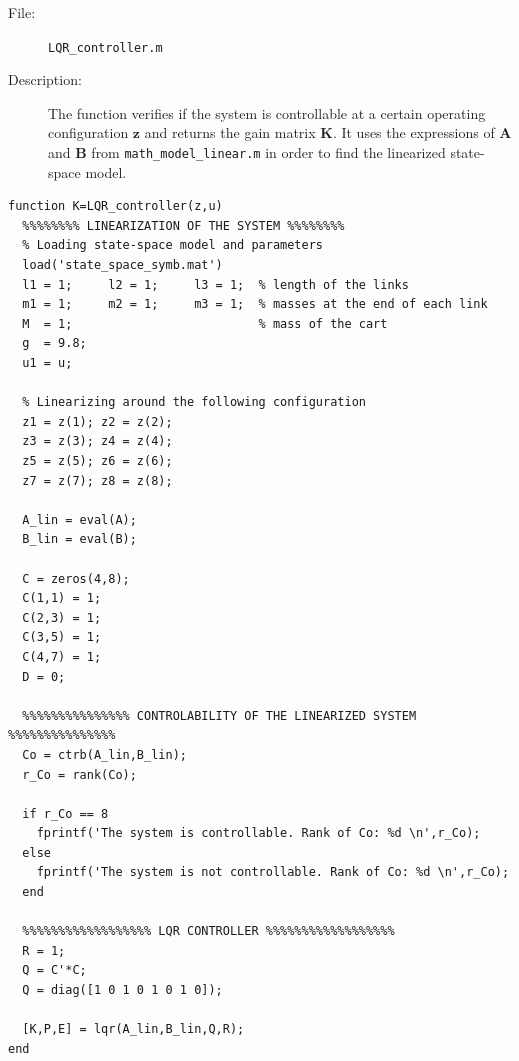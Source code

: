 \documentclass[a4paper,12pt]{article}
\begin{document}
\begin{description}
	\item[File:] \texttt{LQR\_controller.m}
	\item[Description:] The function verifies if the system is controllable at a certain operating configuration $\mathbf{z}$ and returns the gain matrix $\mathbf{K}$. It uses the expressions of $\mathbf{A}$ and $\mathbf{B}$ from \texttt{math\_model\_linear.m} in order to find the linearized state-space model.
\end{description}
\begin{lstlisting}[label=code:LQR,caption=\texttt{LQR\_controller.m}]
function K=LQR_controller(z,u)
  %%%%%%%% LINEARIZATION OF THE SYSTEM %%%%%%%%
  % Loading state-space model and parameters
  load('state_space_symb.mat')
  l1 = 1;     l2 = 1;     l3 = 1;  % length of the links
  m1 = 1;     m2 = 1;     m3 = 1;  % masses at the end of each link
  M  = 1;                          % mass of the cart
  g  = 9.8;
  u1 = u;

  % Linearizing around the following configuration
  z1 = z(1); z2 = z(2);
  z3 = z(3); z4 = z(4);
  z5 = z(5); z6 = z(6);
  z7 = z(7); z8 = z(8);

  A_lin = eval(A);
  B_lin = eval(B);

  C = zeros(4,8);
  C(1,1) = 1;
  C(2,3) = 1;
  C(3,5) = 1;
  C(4,7) = 1;
  D = 0;

  %%%%%%%%%%%%%%% CONTROLABILITY OF THE LINEARIZED SYSTEM %%%%%%%%%%%%%%%
  Co = ctrb(A_lin,B_lin);
  r_Co = rank(Co);

  if r_Co == 8
    fprintf('The system is controllable. Rank of Co: %d \n',r_Co);
  else
    fprintf('The system is not controllable. Rank of Co: %d \n',r_Co);
  end

  %%%%%%%%%%%%%%%%%% LQR CONTROLLER %%%%%%%%%%%%%%%%%%
  R = 1;
  Q = C'*C;
  Q = diag([1 0 1 0 1 0 1 0]);

  [K,P,E] = lqr(A_lin,B_lin,Q,R);
end
\end{lstlisting}
\end{document}
